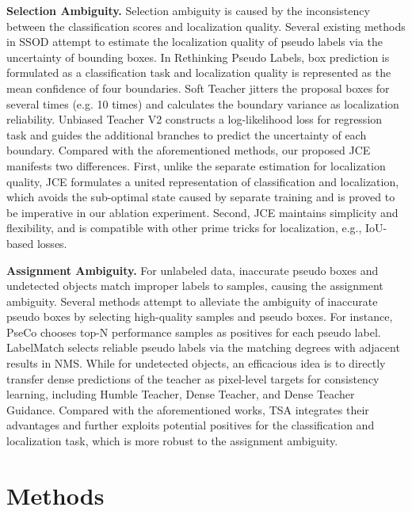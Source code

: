 \documentclass[10pt,twocolumn,letterpaper]{article}
\begin{document}
\noindent\textbf{Selection Ambiguity.}
Selection ambiguity is caused by the inconsistency between the classification scores and localization quality.
Several existing methods\cite{RethinkingPseudoLabel,SoftTea,UnbiasedV2} in SSOD attempt to estimate the localization quality of pseudo labels via the uncertainty of bounding boxes.
In Rethinking Pseudo Labels\cite{RethinkingPseudoLabel}, box prediction is formulated as a classification task and localization quality is represented as the mean confidence of four boundaries.
Soft Teacher\cite{SoftTea} jitters the proposal boxes for several times (e.g. 10 times) and calculates the boundary variance as localization reliability. 
Unbiased Teacher V2\cite{UnbiasedV2} constructs a log-likelihood loss for regression task and guides the additional branches to predict the uncertainty of each boundary.
Compared with the aforementioned methods, our proposed JCE manifests two differences.
First, unlike the separate estimation for localization quality, JCE formulates a united representation of classification and localization, which avoids the sub-optimal state caused by separate training and is proved to be imperative in our ablation experiment.
Second, JCE maintains simplicity and flexibility, and is compatible with other prime tricks for localization, e.g., IoU-based losses.

\noindent\textbf{Assignment Ambiguity.}
For unlabeled data, inaccurate pseudo boxes and undetected objects match improper labels to samples, causing the assignment ambiguity.
Several methods attempt to alleviate the ambiguity of inaccurate pseudo boxes by selecting high-quality samples and pseudo boxes.
For instance, PseCo\cite{Pseco} chooses top-N performance samples as positives for each pseudo label.
LabelMatch\cite{LabelMatch} selects reliable pseudo labels via the matching degrees with adjacent results in NMS.
While for undetected objects, an efficacious idea is to directly transfer dense predictions of the teacher as pixel-level targets for consistency learning, including Humble Teacher\cite{HumbleTeacher}, Dense Teacher\cite{DenseTeacher}, and Dense Teacher Guidance\cite{DenseGuided}.
Compared with the aforementioned works, TSA integrates their advantages and further exploits potential positives for the classification and localization task, which is more robust to the assignment ambiguity.

\section{Methods}
\label{sec3}
\end{document}
